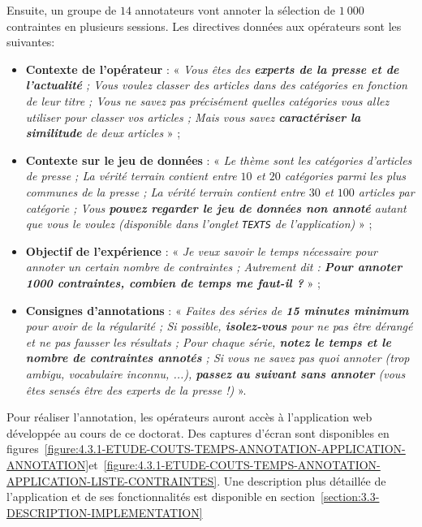 			Ensuite, un groupe de $14$ annotateurs vont annoter la sélection de $1~000$ contraintes en plusieurs sessions.
			Les directives données aux opérateurs sont les suivantes:
			\begin{itemize}
				\item \textbf{Contexte de l'opérateur} :
				« \textit{Vous êtes des \textbf{experts de la presse et de l’actualité} ; Vous voulez classer des articles dans des catégories en fonction de leur titre ; Vous ne savez pas précisément quelles catégories vous allez utiliser pour classer vos articles ; Mais vous savez \textbf{caractériser la similitude} de deux articles} » ;
				\item \textbf{Contexte sur le jeu de données} :
				« \textit{Le thème sont les catégories d’articles de presse ; La vérité terrain contient entre $10$ et $20$ catégories parmi les plus communes de la presse ; La vérité terrain contient entre $30$ et $100$ articles par catégorie ; Vous \textbf{pouvez regarder le jeu de données non annoté} autant que vous le voulez (disponible dans l'onglet \texttt{TEXTS} de l'application)} » ;
				\item \textbf{Objectif de l'expérience} :
				« \textit{Je veux savoir le temps nécessaire pour annoter un certain nombre de contraintes ; Autrement dit : \textbf{Pour annoter 1000 contraintes, combien de temps me faut-il ?}} » ;
				\item \textbf{Consignes d'annotations} :
				« \textit{Faites des séries de \textbf{15 minutes minimum} pour avoir de la régularité ; Si possible, \textbf{isolez-vous} pour ne pas être dérangé et ne pas fausser les résultats ; Pour chaque série, \textbf{notez le temps et le nombre de contraintes annotés} ; Si vous ne savez pas quoi annoter (trop ambigu, vocabulaire inconnu, ...), \textbf{passez au suivant sans annoter} (vous êtes sensés être des experts de la presse !)} ».
			\end{itemize}
			Pour réaliser l'annotation, les opérateurs auront accès à l'application web développée au cours de ce doctorat.
			Des captures d'écran sont disponibles en figures~\ref{figure:4.3.1-ETUDE-COUTS-TEMPS-ANNOTATION-APPLICATION-ANNOTATION}et~\ref{figure:4.3.1-ETUDE-COUTS-TEMPS-ANNOTATION-APPLICATION-LISTE-CONTRAINTES}.
			Une description plus détaillée de l'application et de ses fonctionnalités est disponible en section~\ref{section:3.3-DESCRIPTION-IMPLEMENTATION}
